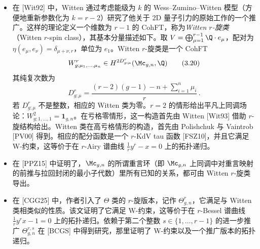 \begin{example}[3.2]
\begin{itemize}
  \item 在 [Wit92] 中，Witten 通过考虑能级为 $k$ 的 Wess--Zumino--Witten 模型（方便地重新参数化为 $k=r-2$）研究了他关于 2D 量子引力的原始工作的一个推广。这样的理论定义一个维数为 $r-1$ 的 CohFT，称为\emph{Witten $r$-旋类}（Witten $r$-spin class），其基本分量描述如下。取 $V=\bigoplus_{\mu=1}^{r-1}\Q\cdot e_{\mu}$，配对为 $\eta(e_{\mu},e_{\nu})=\delta_{\mu+\nu,r}$，单位为 $e_{1}$。Witten $r$-旋类是一个 CohFT
  \begin{equation}
    W^{r}_{g;\mu_{1},\dots,\mu_{n}}\in H^{2D^{r}_{g;\mu}}(\Mc_{g,n},\Q)
    \tag{3.20}
  \end{equation}
  其纯复次数为
  \begin{equation}
    D^{r}_{g;\mu}=\frac{(r-2)(g-1)-n+\sum_{i=1}^{n}\mu_{i}}{r}\,.
    \tag{3.21}
  \end{equation}
  若 $D^{r}_{g;\mu}$ 不是整数，相应的 Witten 类为零。$r=2$ 的情形给出平凡上同调场论：$W^{2}_{g;1,\dots,1}=\mathbf{1}_{g,n}$。在亏格零情形，这一构造首先由 Witten [Wit93] 借助 $r$-旋结构给出。Witten 类在高亏格情形的构造，首先由 Polishchuk 与 Vaintrob [PV00] 得到。相应的配分函数是一个 $r$-KdV tau 函数 [FSZ10]，并且它满足 W-约束，这等价于在 $r$-Airy 谱曲线 $\frac{1}{r}y^{r}-x=0$ 上的拓扑递归。
  \item 在 [PPZ15] 中证明了，$\Mc_{g,n}$ 的所谓重言环（即 $\Mc_{g,n}$ 上同调中对重言映射的前推与拉回封闭的最小子代数）里所有已知的关系，都可由 Witten $r$-旋类导出。
  \item 在 [CGG25] 中，作者引入了 $\Theta$ 类的 $r$-旋版本，记作 $\Theta^{r}_{g,n}$，它满足与 Witten 类相类似的性质。该文证明了它满足 W-约束，这等价于在 $r$-Bessel 谱曲线 $\frac{1}{r}y^{r}x-1=0$ 上的拓扑递归。依赖于第二个整数 $s\in\{1,\dots,r-1\}$ 的进一步推广 $\Theta^{r,s}_{g,n}$ 在 [BCGS] 中得到研究，那里证明了 W-约束以及一个推广版本的拓扑递归。

\end{itemize}
\end{example}

